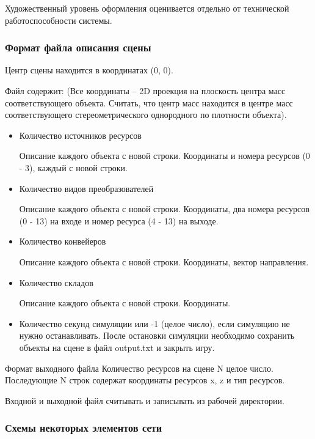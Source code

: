 Художественный уровень оформления оценивается отдельно от технической работоспособности системы.	

\subsubsection*{Формат файла описания сцены}

Центр сцены находится в координатах (0, 0).

Файл содержит: (Все координаты -- 2D проекция на плоскость центра масс соответствующего объекта. Считать, что центр масс находится в центре масс соответствующего стереометрического однородного по плотности объекта).

\begin{itemize}
    \item Количество источников ресурсов
    
    Описание каждого объекта с новой строки. Координаты и номера ресурсов (0 - 3), каждый с новой строки.
    
    \item Количество видов преобразователей    
    
    Описание каждого объекта с новой строки. Координаты, два номера ресурсов (0 - 13) на входе и номер ресурса (4 - 13) на выходе.
    
    \item Количество конвейеров
    
    Описание каждого объекта с новой строки. Координаты, вектор направления.
    
    \item Количество складов
    
    Описание каждого объекта с новой строки. Координаты.
    
    \item Количество секунд симуляции или -1 (целое число), если симуляцию не нужно останавливать. После остановки симуляции необходимо сохранить объекты на сцене в файл output.txt и закрыть игру.        
\end{itemize}

Формат выходного файла
Количество ресурсов на сцене N целое число.
Последующие N строк содержат координаты ресурсов x, z и тип ресурсов.

Входной и выходной файл считывать и записывать из рабочей директории.

\subsubsection*{Схемы некоторых элементов сети}

